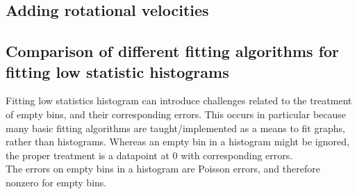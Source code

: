 \subsection{Adding rotational velocities}
\subsection{Comparison of different fitting algorithms for fitting low statistic histograms}\label{sec:App:lowStatFitting}
Fitting low statistics histogram can introduce challenges related to the treatment of empty bins, and their corresponding errors. This occurs in particular because many basic fitting algorithms are taught/implemented as a means to fit graphs, rather than histograms. Whereas an empty bin in a histogram might be ignored, the proper treatment is a datapoint at 0 with corresponding errors. \\

The errors on empty bins in a histogram are Poisson errors, and therefore nonzero for empty bins.